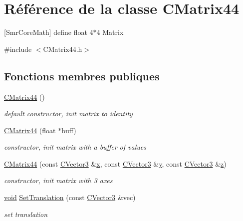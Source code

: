 \hypertarget{class_c_matrix44}{\section{Référence de la classe C\-Matrix44}
\label{class_c_matrix44}
}


\mbox{[}Smr\-Core\-Math\mbox{]} define float 4$\ast$4 Matrix  




{\ttfamily \#include $<$C\-Matrix44.\-h$>$}

\subsection*{Fonctions membres publiques}
\begin{DoxyCompactItemize}
\item 
\hyperlink{class_c_matrix44_a55dd2245b2ee3abecae6834c07daa739}{C\-Matrix44} ()
\begin{DoxyCompactList}\small\item\em default constructor, init matrix to identity \end{DoxyCompactList}\item 
\hyperlink{class_c_matrix44_a584fe9facfac7807923a1f1870a3d53f}{C\-Matrix44} (float $\ast$buff)
\begin{DoxyCompactList}\small\item\em constructor, init matrix with a buffer of values \end{DoxyCompactList}\item 
\hyperlink{class_c_matrix44_a39a96a7aa171ad973d9cc8d195c9ad4e}{C\-Matrix44} (const \hyperlink{class_c_vector3}{C\-Vector3} \&\hyperlink{gl_8h_a0cdec8e97a75ee9458b23d152bf962d4}{x}, const \hyperlink{class_c_vector3}{C\-Vector3} \&\hyperlink{gl_8h_a74d80fd479c0f6d0153c709949a089ef}{y}, const \hyperlink{class_c_vector3}{C\-Vector3} \&\hyperlink{glext_8h_aee38b51639b577753f6a92029fb92000}{z})
\begin{DoxyCompactList}\small\item\em constructor, init matrix with 3 axes \end{DoxyCompactList}\item 
\hyperlink{glu_8h_a4292190e3f1f6b373a760c7d9316ad3c}{void} \hyperlink{class_c_matrix44_a7d0859d97ff67c23e7767445f7f6b759}{Set\-Translation} (const \hyperlink{class_c_vector3}{C\-Vector3} \&vec)
\begin{DoxyCompactList}\small\item\em set translation \end{DoxyCompactList}\item 

\end{DoxyCompactItemize}
